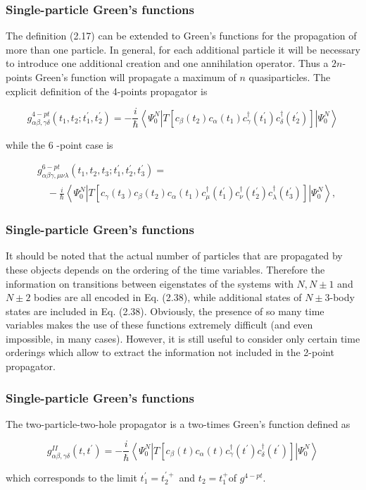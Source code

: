 \documentclass[compress]{beamer}
\begin{document}
\frame
{
\frametitle{Single-particle Green's functions}
\begin{small}
{\scriptsize
The definition (2.17) can be extended to Green's functions for the
propagation of more than one particle. In general, for each additional
particle it will be necessary to introduce one additional creation and
one annihilation operator. Thus a $2 n$-points Green's function will
propagate a maximum of $n$ quasiparticles. The explicit definition of
the 4-points propagator is

$$
g_{\alpha \beta, \gamma \delta}^{4-p t}\left(t_{1}, t_{2} ; t_{1}^{\prime}, t_{2}^{\prime}\right)=-\frac{i}{\hbar}\left\langle\Psi_{0}^{N}\left|T\left[c_{\beta}\left(t_{2}\right) c_{\alpha}\left(t_{1}\right) c_{\gamma}^{\dagger}\left(t_{1}^{\prime}\right) c_{\delta}^{\dagger}\left(t_{2}^{\prime}\right)\right]\right| \Psi_{0}^{N}\right\rangle
$$

while the 6 -point case is

$$
\begin{aligned}
& g_{\alpha \beta \gamma, \mu \nu \lambda}^{6-p t}\left(t_{1}, t_{2}, t_{3} ; t_{1}^{\prime}, t_{2}^{\prime}, t_{3}^{\prime}\right)= \\
& \quad-\frac{i}{\hbar}\left\langle\Psi_{0}^{N}\left|T\left[c_{\gamma}\left(t_{3}\right) c_{\beta}\left(t_{2}\right) c_{\alpha}\left(t_{1}\right) c_{\mu}^{\dagger}\left(t_{1}^{\prime}\right) c_{\nu}^{\dagger}\left(t_{2}^{\prime}\right) c_{\lambda}^{\dagger}\left(t_{3}^{\prime}\right)\right]\right| \Psi_{0}^{N}\right\rangle,
\end{aligned}
$$

}
\end{small}
}
\frame
{
\frametitle{Single-particle Green's functions}
\begin{small}
{\scriptsize
It should be noted that the actual number of particles that are
propagated by these objects depends on the ordering of the time
variables. Therefore the information on transitions between
eigenstates of the systems with $N, N \pm 1$ and $N \pm 2$ bodies are
all encoded in Eq. (2.38), while additional states of $N \pm 3$-body
states are included in Eq. (2.38). Obviously, the presence of so many
time variables makes the use of these functions extremely difficult
(and even impossible, in many cases). However, it is still useful to
consider only certain time orderings which allow to extract the
information not included in the 2-point propagator.

}
\end{small}
}
\frame
{
\frametitle{Single-particle Green's functions}
\begin{small}
{\scriptsize
The two-particle-two-hole propagator is a two-times Green's function
defined as

$$
g_{\alpha \beta, \gamma \delta}^{I I}\left(t, t^{\prime}\right)=-\frac{i}{\hbar}\left\langle\Psi_{0}^{N}\left|T\left[c_{\beta}(t) c_{\alpha}(t) c_{\gamma}^{\dagger}\left(t^{\prime}\right) c_{\delta}^{\dagger}\left(t^{\prime}\right)\right]\right| \Psi_{0}^{N}\right\rangle
$$

which corresponds to the limit $t_{1}^{\prime}=t_{2}^{\prime+}$ and $t_{2}=t_{1}^{+}$of $g^{4-p t}$.

}
\end{small}
}
\end{document}
